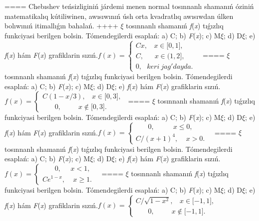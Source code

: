 ====
Chebıshev teńsizliginiń járdemi menen normal tosınnanlı shamanıń óziniń matematikalıq kútiliwinen, awısıwınıń úsh orta kvadratlıq awısıwdan úlken bolıwınıń itimallıǵın bahalań.
++++
$\xi$ tosınnanlı shamanıń \emph{f}(\emph{x}) tıǵızlıq funkciyasi berilgen bolsin. Tómendegilerdi esaplań: a) C; b) \emph{F}(\emph{x}); c) M$\xi$; d) D$\xi$; e) \emph{f}(\emph{x}) hám \emph{F}(\emph{x}) grafiklarin sızıń.\(f(x) = \left\{ \begin{matrix}
Cx,\ \ \ \ x \in \lbrack 0,1\rbrack, \\
C,\ \ \ \ \ \ \ x \in (1,2\rbrack, \\
0,\ \ \ keri\ jag'dayda.\ \ 
\end{matrix} \right.\ \)
====
$\xi$ tosınnanlı shamanıń \emph{f}(\emph{x}) tıǵızlıq funkciyasi berilgen bolsin. Tómendegilerdi esaplań: a) C; b) \emph{F}(\emph{x}); c) M$\xi$; d) D$\xi$; e) \emph{f}(\emph{x}) hám \emph{F}(\emph{x}) grafiklarin sızıń.\(f(x) = \left\{ \begin{matrix}
C(1 - x/3),\ \ \ \ x \in \lbrack 0,3\rbrack, \\
\ \ \ \ \ \ \ \ 0,\ \ \ \ \ \ \ \ \ \ \ x \notin \lbrack 0,3\rbrack.\ \ 
\end{matrix} \right.\ \)
====
$\xi$ tosınnanlı shamanıń \emph{f}(\emph{x}) tıǵızlıq funkciyasi berilgen bolsin. Tómendegilerdi esaplań: a) C; b) \emph{F}(\emph{x}); c) M$\xi$; d) D$\xi$; e) \emph{f}(\emph{x}) hám \emph{F}(\emph{x}) grafiklarin sızıń.\(f(x) = \left\{ \begin{matrix}
\ \ \ \ \ \ \ \ 0,\ \ \ \ \ \ \ \ \ \ \ \ x \leq 0, \\
C/(x + 1)^{4},\ \ \ \ \ x > 0.\ \ 
\end{matrix} \right.\ \)
====
$\xi$ tosınnanlı shamanıń \emph{f}(\emph{x}) tıǵızlıq funkciyasi berilgen bolsin. Tómendegilerdi esaplań: a) C; b) \emph{F}(\emph{x}); c) M$\xi$; d) D$\xi$; e) \emph{f}(\emph{x}) hám \emph{F}(\emph{x}) grafiklarin sızıń.\(f(x) = \left\{ \begin{matrix}
\ \ \ \ \ \ \ \ 0,\ \ \ \ \ \ x < 1, \\
Ce^{1 - x},\ \ \ \ \ x \geq 1.\ \ 
\end{matrix} \right.\ \)
====
$\xi$ tosınnanlı shamanıń \emph{f}(\emph{x}) tıǵızlıq funkciyasi berilgen bolsin. Tómendegilerdi esaplań: a) C; b) \emph{F}(\emph{x}); c) M$\xi$; d) D$\xi$; e) \emph{f}(\emph{x}) hám \emph{F}(\emph{x}) grafiklarin sızıń.\(f(x) = \left\{ \begin{matrix}
C/\sqrt{1 - x^{2}},\ \ \ \ x \in \lbrack - 1,1\rbrack, \\
\ \ \ \ \ \ \ \ 0,\ \ \ \ \ \ \ \ \ \ \ x \notin \lbrack - 1,1\rbrack.\ \ 
\end{matrix} \right.\ \)
